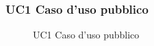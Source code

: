 \subsubsection{UC1 Caso d'uso pubblico}
\begin{figure}[H]
\centering
\noindent{}
\caption{UC1 Caso d'uso pubblico}
\end{figure}
